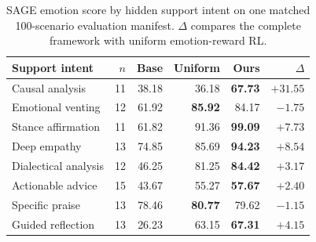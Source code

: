 \begin{table}[t]
\centering
\small
\setlength{\tabcolsep}{2pt}
\begin{tabular}{lrrrrr}
\toprule
Support intent & $n$ & Base & Uniform & Ours & $\Delta$\\
\midrule
Causal analysis      & 11 & 38.18 & 36.18 & \textbf{67.73} & $+31.55$\\
Emotional venting    & 12 & 61.92 & \textbf{85.92} & 84.17 & $-1.75$\\
Stance affirmation   & 11 & 61.82 & 91.36 & \textbf{99.09} & $+7.73$\\
Deep empathy         & 13 & 74.85 & 85.69 & \textbf{94.23} & $+8.54$\\
Dialectical analysis & 12 & 46.25 & 81.25 & \textbf{84.42} & $+3.17$\\
Actionable advice    & 15 & 43.67 & 55.27 & \textbf{57.67} & $+2.40$\\
Specific praise      & 13 & 78.46 & \textbf{80.77} & 79.62 & $-1.15$\\
Guided reflection    & 13 & 26.23 & 63.15 & \textbf{67.31} & $+4.15$\\
\bottomrule
\end{tabular}
\caption{SAGE emotion score by hidden support intent on one matched 100-scenario evaluation manifest. $\Delta$ compares the complete framework with uniform emotion-reward RL.}
\label{tab:intent-breakdown}
\end{table}
